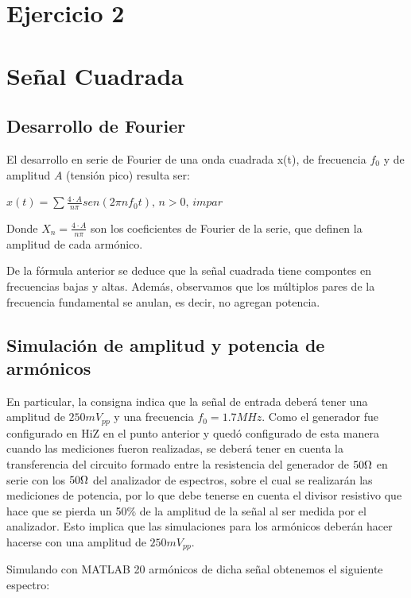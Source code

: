 \documentclass[../../labo_tp5_main.tex]{subfiles}
\begin{document}
\section{Ejercicio 2}

\section{Señal Cuadrada}

\subsection{Desarrollo de Fourier}
El desarrollo en serie de Fourier de una onda cuadrada x(t), de frecuencia $f_0$ y de amplitud $A$ (tensión pico) resulta ser: \par
\begin{center}
$x(t) = \sum\frac{4\cdot A}{n\pi}sen(2\pi nf_{0}t),\,n>0,\,impar$
\end{center}
Donde $X_n = \frac{4\cdot A}{n\pi}$ son los coeficientes de Fourier de la serie, que definen la amplitud de cada armónico.\par
De la fórmula anterior se deduce que la señal cuadrada tiene compontes en frecuencias bajas y altas. Además, observamos que los múltiplos pares de la frecuencia fundamental se anulan, es decir, no agregan potencia.\par

\subsection{Simulación de amplitud y potencia de armónicos}

En particular, la consigna indica que la señal de entrada deberá tener una amplitud de $250mV_{pp}$ y una frecuencia $f_0 = 1.7MHz$. Como el generador fue configurado en HiZ en el punto anterior y quedó configurado de esta manera cuando las mediciones fueron realizadas, se deberá tener en cuenta la transferencia del circuito formado entre la resistencia del generador de $50\ohm$  en serie con los $50\ohm$ del analizador de espectros, sobre el cual se realizarán las mediciones de potencia, por lo que debe tenerse en cuenta el divisor resistivo que hace que se pierda un 50\% de la amplitud de la señal al ser medida por el analizador. Esto implica que las simulaciones para los armónicos deberán hacer hacerse con una amplitud de $250mV_{pp}$.\par
Simulando con MATLAB 20 armónicos de dicha señal obtenemos el siguiente espectro: \par
\end{document}
